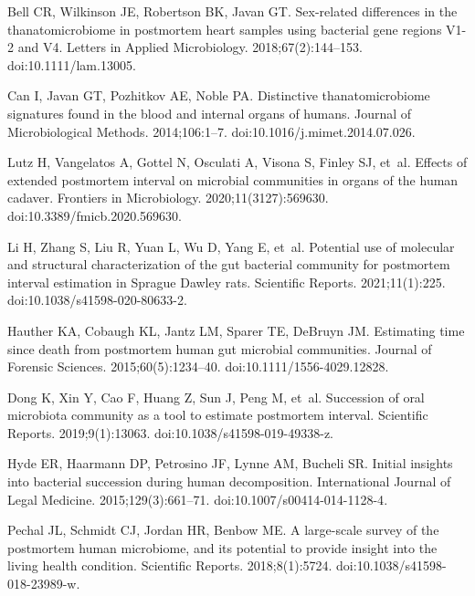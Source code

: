 \documentclass[
  10pt,
  letterpaper,
]{article}
\begin{document}
\begin{thebibliography}{10}
  Bell CR, Wilkinson JE, Robertson BK, Javan GT.
  \newblock Sex-related differences in the thanatomicrobiome in postmortem heart
    samples using bacterial gene regions {V1}-2 and {V4}.
  \newblock Letters in Applied Microbiology. 2018;67(2):144--153.
  \newblock doi:{10.1111/lam.13005}.
  
  Can I, Javan GT, Pozhitkov AE, Noble PA.
  \newblock Distinctive thanatomicrobiome signatures found in the blood and
    internal organs of humans.
  \newblock Journal of Microbiological Methods. 2014;106:1--7.
  \newblock doi:{10.1016/j.mimet.2014.07.026}.
  
  Lutz H, Vangelatos A, Gottel N, Osculati A, Visona S, Finley SJ, et~al.
  \newblock Effects of extended postmortem interval on microbial communities in
    organs of the human cadaver.
  \newblock Frontiers in Microbiology. 2020;11(3127):569630.
  \newblock doi:{10.3389/fmicb.2020.569630}.
  
  Li H, Zhang S, Liu R, Yuan L, Wu D, Yang E, et~al.
  \newblock Potential use of molecular and structural characterization of the gut
    bacterial community for postmortem interval estimation in {Sprague} {Dawley}
    rats.
  \newblock Scientific Reports. 2021;11(1):225.
  \newblock doi:{10.1038/s41598-020-80633-2}.
  
  Hauther KA, Cobaugh KL, Jantz LM, Sparer TE, DeBruyn JM.
  \newblock Estimating time since death from postmortem human gut microbial
    communities.
  \newblock Journal of Forensic Sciences. 2015;60(5):1234--40.
  \newblock doi:{10.1111/1556-4029.12828}.
  
  Dong K, Xin Y, Cao F, Huang Z, Sun J, Peng M, et~al.
  \newblock Succession of oral microbiota community as a tool to estimate
    postmortem interval.
  \newblock Scientific Reports. 2019;9(1):13063.
  \newblock doi:{10.1038/s41598-019-49338-z}.
  
  Hyde ER, Haarmann DP, Petrosino JF, Lynne AM, Bucheli SR.
  \newblock Initial insights into bacterial succession during human
    decomposition.
  \newblock International Journal of Legal Medicine. 2015;129(3):661--71.
  \newblock doi:{10.1007/s00414-014-1128-4}.
  
  Pechal JL, Schmidt CJ, Jordan HR, Benbow ME.
  \newblock A large-scale survey of the postmortem human microbiome, and its
    potential to provide insight into the living health condition.
  \newblock Scientific Reports. 2018;8(1):5724.
  \newblock doi:{10.1038/s41598-018-23989-w}.
  

\end{thebibliography}
\end{document}
